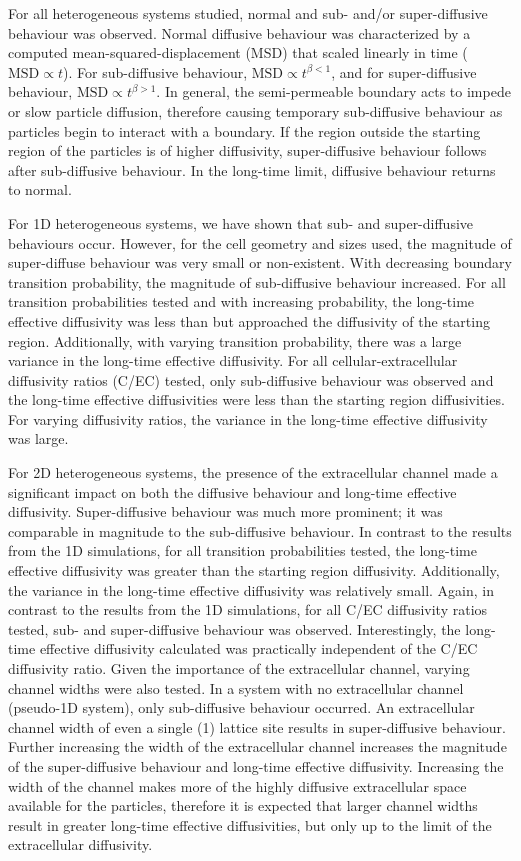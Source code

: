 	For all heterogeneous systems studied, normal and sub- and/or super-diffusive behaviour was observed. Normal diffusive behaviour was characterized by a computed mean-squared-displacement (MSD) that scaled linearly in time ($ \textrm{MSD} \propto t $). For sub-diffusive behaviour, $ \textrm{MSD} \propto t^{\beta < 1} $, and for super-diffusive behaviour, $ \textrm{MSD} \propto t^{\beta > 1} $. In general, the semi-permeable boundary acts to impede or slow particle diffusion, therefore causing temporary sub-diffusive behaviour as particles begin to interact with a boundary. If the region outside the starting region of the particles is of higher diffusivity, super-diffusive behaviour follows after sub-diffusive behaviour. In the long-time limit, diffusive behaviour returns to normal.
	
	For 1D heterogeneous systems, we have shown that sub- and super-diffusive behaviours occur. However, for the cell geometry and sizes used, the magnitude of super-diffuse behaviour was very small or non-existent. With decreasing boundary transition probability, the magnitude of sub-diffusive behaviour increased. For all transition probabilities tested and with increasing probability, the long-time effective diffusivity was less than but approached the diffusivity of the starting region. Additionally, with varying transition probability, there was a large variance in the long-time effective diffusivity. For all cellular-extracellular diffusivity ratios (C/EC) tested, only sub-diffusive behaviour was observed and the long-time effective diffusivities were less than the starting region diffusivities. For varying diffusivity ratios, the variance in the long-time effective diffusivity was large.
	
	For 2D heterogeneous systems, the presence of the extracellular channel made a significant impact on both the diffusive behaviour and long-time effective diffusivity. Super-diffusive behaviour was much more prominent; it was comparable in magnitude to the sub-diffusive behaviour. In contrast to the results from the 1D simulations, for all transition probabilities tested, the long-time effective diffusivity was greater than the starting region diffusivity. Additionally, the variance in the long-time effective diffusivity was relatively small. Again, in contrast to the results from the 1D simulations, for all C/EC diffusivity ratios tested, sub- and super-diffusive behaviour was observed. Interestingly, the long-time effective diffusivity calculated was practically independent of the C/EC diffusivity ratio. Given the importance of the extracellular channel, varying channel widths were also tested. In a system with no extracellular channel (pseudo-1D system), only sub-diffusive behaviour occurred. An extracellular channel width of even a single (1) lattice site results in super-diffusive behaviour. Further increasing the width of the extracellular channel increases the magnitude of the super-diffusive behaviour and long-time effective diffusivity. Increasing the width of the channel makes more of the highly diffusive extracellular space available for the particles, therefore it is expected that larger channel widths result in greater long-time effective diffusivities, but only up to the limit of the extracellular diffusivity.
	
